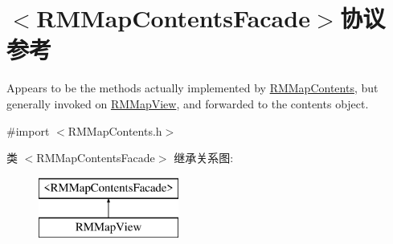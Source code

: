 \hypertarget{protocol_r_m_map_contents_facade-p}{\section{$<$R\-M\-Map\-Contents\-Facade$>$协议 参考}
\label{protocol_r_m_map_contents_facade-p}
}


Appears to be the methods actually implemented by \hyperlink{interface_r_m_map_contents}{R\-M\-Map\-Contents}, but generally invoked on \hyperlink{interface_r_m_map_view}{R\-M\-Map\-View}, and forwarded to the contents object.  




{\ttfamily \#import $<$R\-M\-Map\-Contents.\-h$>$}

类 $<$R\-M\-Map\-Contents\-Facade$>$ 继承关系图\-:\begin{figure}[H]
\begin{center}
\leavevmode
\includegraphics[height=2.000000cm]{protocol_r_m_map_contents_facade-p}
\end{center}
\end{figure}
